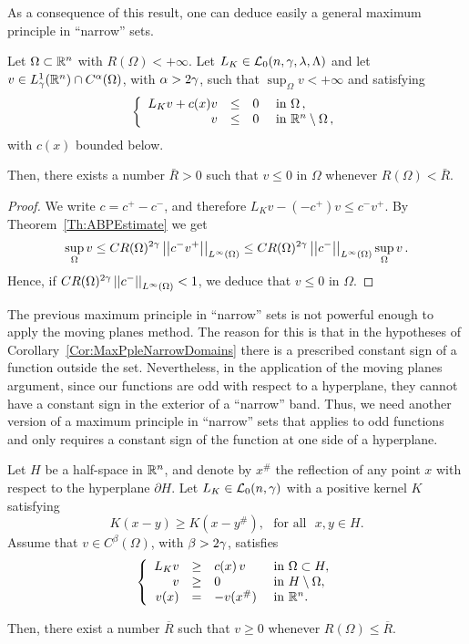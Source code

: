 As a consequence of this result, one can deduce easily a general maximum principle in ``narrow'' sets.

\begin{corollary}
	\label{Cor:MaxPpleNarrowDomains}
	Let $\Omega \subset \mathbb{R}^n$ with $R(\Omega) < +\infty$. Let $L_K \in \mathcal{L}_0(n,\gamma,\lambda, \Lambda)$ and let $v\in L^1_\gamma(\mathbb{R}^n)\cap C^{\alpha}(\Omega)$, with $\alpha > 2\gamma$, such that $\sup_{\Omega} v < +\infty$ and satisfying
	$$
	\left\{\begin{array}{rcll}
	L_K v + c(x)v &\leq & 0 & \text{ in } \Omega\,, \\
	v & \leq & 0 & \text{ in } \mathbb{R}^n\setminus \Omega\,,
	\end{array} \right.
	$$
	with $c(x)$ bounded below.
	
	Then, there exists a number $\bar{R} > 0$ such that $v \leq 0$ in $\Omega$ whenever $R(\Omega)< \bar{R}$.	
\end{corollary}

\begin{proof}
	We write $c= c^+ - c^-$, and therefore $L_K v -(-c^+)v \leq c^- v^+	$. By Theorem~\ref{Th:ABPEstimate} we get
	$$
	\sup_\Omega v \leq C R(\Omega)^{2\gamma} \left | \left |{c^- v^+} \right | \right |_{L^\infty(\Omega)} \leq C R(\Omega)^{2\gamma} \left | \left |{c^-} \right | \right |_{L^\infty(\Omega)} \sup_\Omega v\,.
	$$
	Hence, if $C R(\Omega)^{2\gamma} \left | \left |{c^-} \right | \right |_{L^\infty(\Omega)}  <1 $, we deduce that $v\leq 0$ in $\Omega$.
\end{proof}


The previous maximum principle in ``narrow'' sets is not powerful enough to apply the moving planes method. The reason for this is that in the hypotheses of Corollary~\ref{Cor:MaxPpleNarrowDomains} there is a prescribed constant sign of a function outside the set. Nevertheless, in the application of the moving planes argument, since our functions are odd with respect to a hyperplane, they cannot have a constant sign in the exterior of a ``narrow'' band. Thus, we need another version of a maximum principle in ``narrow'' sets that applies to odd functions and only requires a constant sign of the function at one side of a hyperplane.

\begin{proposition}
	\label{Prop:MaxPrpNarrowOdd}
	Let $H$ be a half-space in $\mathbb{R}^n$, and denote by $x^\#$ the reflection of any point $x$ with respect to the hyperplane $\partial H$. Let $L_K \in \mathcal{L}_0(n,\gamma)$ with a positive kernel $K$ satisfying
	\begin{equation}
	\label{Eq:KernelSymmetry}
	K(x-y) \geq K(x-y^\#), \,\,\,\,\text{for all } \,\, x,y\in H.
	\end{equation}
	Assume that $v\in C^{\beta}(\Omega)$, with $\beta > 2\gamma$, satisfies
	\begin{equation*}
	\left\{\begin{array}{rcll}
	L_K  v &\geq& c(x)\,v  &\textrm{ in } \Omega\subset H,\\
	v &\geq& 0 &\textrm{ in } H\setminus\Omega,\\
	v(x) &=& -v(x^\#) &\textrm{ in } \mathbb{R}^n.
	\end{array} \right.
	\end{equation*}
	
	Then, there exist a number $\overline{R}$ such that $v \geq 0$ whenever $R(\Omega) \leq \overline{R}$.
\end{proposition}

